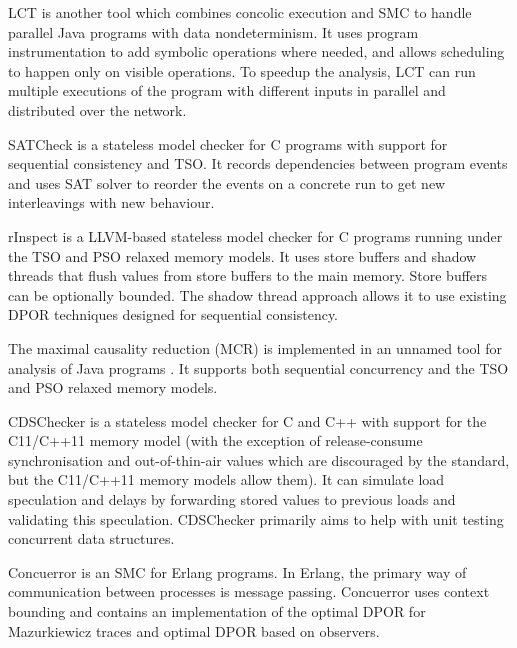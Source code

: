 LCT  is another tool which combines concolic execution and SMC to handle parallel Java programs with data nondeterminism.
It uses program instrumentation to add symbolic operations where needed, and allows scheduling to happen only on visible operations.
To speedup the analysis, LCT can run multiple executions of the program with different inputs in parallel and distributed over the network.

SATCheck  is a stateless model checker for C programs with support for sequential consistency and TSO.
It records dependencies between program events and uses SAT solver to reorder the events on a concrete run to get new interleavings with new behaviour.

rInspect  is a LLVM-based stateless model checker for C
programs running under the TSO and PSO relaxed memory models.
It uses store buffers and shadow threads that flush values from store buffers
to the main memory.
Store buffers can be optionally bounded.
The shadow thread approach allows it to use existing DPOR techniques designed
for sequential consistency.

The maximal causality reduction (MCR) is implemented in an unnamed tool for analysis of Java programs .
It supports both sequential concurrency and the TSO and PSO relaxed memory models.

CDSChecker  is a stateless model checker for C and C++ with support for the C11/C++11 memory model (with the exception of release-consume synchronisation and out-of-thin-air values which are discouraged by the standard, but the C11/C++11 memory models allow them).
It can simulate load speculation and delays by forwarding stored values to previous loads and validating this speculation.
CDSChecker primarily aims to help with unit testing concurrent data structures.

Concuerror  is an SMC for Erlang programs.
In Erlang, the primary way of communication between processes is message passing.
Concuerror uses context bounding and contains an implementation of the optimal DPOR for Mazurkiewicz traces and optimal DPOR based on observers.

